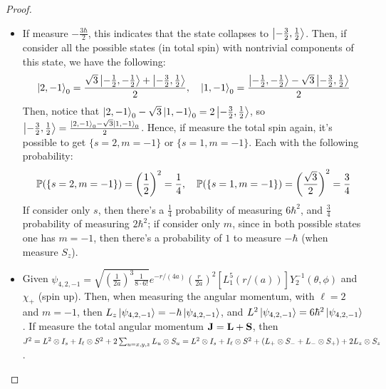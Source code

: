 \documentclass{article}
\begin{document}
\begin{proof}
\begin{itemize}
        \item[(b)] If measure $-\frac{3\hbar}{2}$, this indicates that the state collapses to $\ket{-\frac{3}{2},\frac{1}{2}}$. Then, if consider all the possible states (in total spin) with nontrivial components of this state, we have the following:
        \begin{align}
            \ket{2,-1}_0 = \frac{\sqrt{3}\ket{-\frac{1}{2},-\frac{1}{2}}+\ket{-\frac{3}{2},\frac{1}{2}}}{2},\quad \ket{1,-1}_0 = \frac{\ket{-\frac{1}{2},-\frac{1}{2}}-\sqrt{3}\ket{-\frac{3}{2},\frac{1}{2}}}{2}
        \end{align}
        Then, notice that $\ket{2,-1}_0 - \sqrt{3}\ket{1,-1}_0 = 2\ket{-\frac{3}{2},\frac{1}{2}}$, so $\ket{-\frac{3}{2},\frac{1}{2}}=\frac{\ket{2,-1}_0-\sqrt{3}\ket{1,-1}_0}{2}$. Hence, if measure the total spin again, it's possible to get $\{s=2, m=-1\}$ or $\{s=1,m=-1\}$. Each with the following probability:
        \begin{align}
            \mathbb{P}(\{s=2,m=-1\}) = \left(\frac{1}{2}\right)^2=\frac{1}{4},\quad \mathbb{P}(\{s=1,m=-1\}) = \left(\frac{\sqrt{3}}{2}\right)^2 = \frac{3}{4}
        \end{align}
        If consider only $s$, then there's a $\frac{1}{4}$ probability of measuring $6\hbar^2$, and $\frac{3}{4}$ probability of measuring $2\hbar^2$; if consider only $m$, since in both possible states one has $m=-1$, then there's a probability of $1$ to measure $-\hbar$ (when measure $S_z$).

        \hfil

        \item[(c)] Given $\psi_{4,2,-1}= \sqrt{\left(\frac{1}{2a}\right)^3\frac{1}{8\cdot 6!}}e^{-r/(4a)}\left(\frac{r}{2a}\right)^2[L^{5}_1(r/(a))]Y^{-1}_2(\theta,\phi)$ and $\chi_+$ (spin up). Then, when measuring the angular momentum, with $\ell=2$ and $m=-1$, then $L_z \ket{\psi_{4,2,-1}} = -\hbar\ket{\psi_{4,2,-1}}$, and $L^2 \ket{\psi_{4,2,-1}} = 6\hbar^2\ket{\psi_{4,2,-1}}$. If measure the total angular momentum $\mathbf{J} = \mathbf{L}+\mathbf{S}$, then $J^2 = L^2\otimes I_s + I_\ell \otimes S^2 + 2 \sum_{u=x,y,z}L_u \otimes S_u = L^2\otimes I_s + I_\ell \otimes S^2 + (L_+\otimes S_- + L_-\otimes S_+)+2 L_z\otimes S_z$.
        

\end{itemize}
\end{proof}
\end{document}
